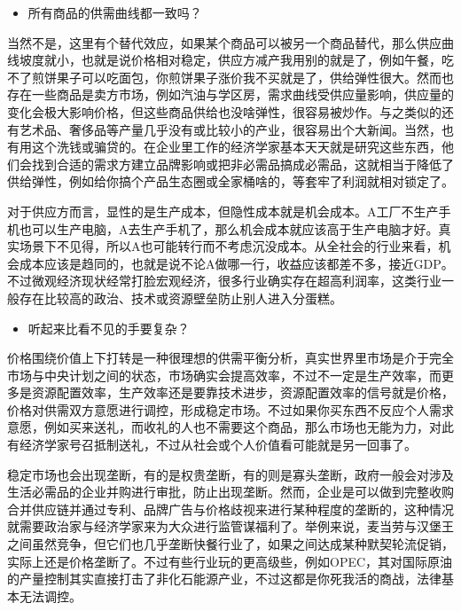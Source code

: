 \documentclass[
  letterpaper,
  DIV=11,
  numbers=noendperiod]{scrreprt}
\providecommand{\tightlist}{%
  \setlength{\itemsep}{0pt}\setlength{\parskip}{0pt}}\usepackage{longtable,booktabs,array}
\begin{document}
\begin{itemize}
\tightlist
\item
  所有商品的供需曲线都一致吗？
\end{itemize}

当然不是，这里有个替代效应，如果某个商品可以被另一个商品替代，那么供应曲线坡度就小，也就是说价格相对稳定，供应方减产我用别的就是了，例如午餐，吃不了煎饼果子可以吃面包，你煎饼果子涨价我不买就是了，供给弹性很大。然而也存在一些商品是卖方市场，例如汽油与学区房，需求曲线受供应量影响，供应量的变化会极大影响价格，但这些商品供给也没啥弹性，很容易被炒作。与之类似的还有艺术品、奢侈品等产量几乎没有或比较小的产业，很容易出个大新闻。当然，也有用这个洗钱或骗贷的。在企业里工作的经济学家基本天天就是研究这些东西，他们会找到合适的需求方建立品牌影响或把非必需品搞成必需品，这就相当于降低了供给弹性，例如给你搞个产品生态圈或全家桶啥的，等套牢了利润就相对锁定了。

对于供应方而言，显性的是生产成本，但隐性成本就是机会成本。A工厂不生产手机也可以生产电脑，A去生产手机了，那么机会成本就应该高于生产电脑才好。真实场景下不见得，所以A也可能转行而不考虑沉没成本。从全社会的行业来看，机会成本应该是趋同的，也就是说不论A做哪一行，收益应该都差不多，接近GDP。不过微观经济现状经常打脸宏观经济，很多行业确实存在超高利润率，这类行业一般存在比较高的政治、技术或资源壁垒防止别人进入分蛋糕。

\begin{itemize}
\tightlist
\item
  听起来比看不见的手要复杂？
\end{itemize}

价格围绕价值上下打转是一种很理想的供需平衡分析，真实世界里市场是介于完全市场与中央计划之间的状态，市场确实会提高效率，不过不一定是生产效率，而更多是资源配置效率，生产效率还是要靠技术进步，资源配置效率的信号就是价格，价格对供需双方意愿进行调控，形成稳定市场。不过如果你买东西不反应个人需求意愿，例如买来送礼，而收礼的人也不需要这个商品，那么市场也无能为力，对此有经济学家号召抵制送礼，不过从社会或个人价值看可能就是另一回事了。

稳定市场也会出现垄断，有的是权贵垄断，有的则是寡头垄断，政府一般会对涉及生活必需品的企业并购进行审批，防止出现垄断。然而，企业是可以做到完整收购合并供应链并通过专利、品牌广告与价格歧视来进行某种程度的垄断的，这种情况就需要政治家与经济学家来为大众进行监管谋福利了。举例来说，麦当劳与汉堡王之间虽然竞争，但它们也几乎垄断快餐行业了，如果之间达成某种默契轮流促销，实际上还是价格垄断了。不过有些行业玩的更高级些，例如OPEC，其对国际原油的产量控制其实直接打击了非化石能源产业，不过这都是你死我活的商战，法律基本无法调控。
\end{document}

